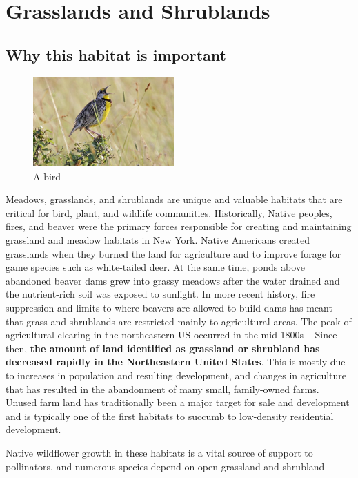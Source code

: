 \section{Grasslands and Shrublands}\label{subsec:grasslandsandshrublands}
\subsection*{Why this habitat is important}
\begin{figure}
    \includegraphics[width=0.48\textwidth]{images/bird.jpg}
  \caption{A bird}
\end{figure}
Meadows, grasslands, and shrublands are unique and valuable habitats that are 
critical for bird, plant, and wildlife communities. Historically, Native 
peoples, fires, and beaver were the primary forces responsible for creating and 
maintaining grassland and meadow habitats in New York. Native Americans created 
grasslands when they burned the land for agriculture and to improve forage for 
game species such as white-tailed deer. At the same time, ponds above abandoned 
beaver dams grew into grassy meadows after the water drained and the 
nutrient-rich soil was exposed to sunlight. In more recent history, fire 
suppression and limits to where beavers are allowed to build dams has meant that 
grass and shrublands are restricted mainly to agricultural areas. The peak of 
agricultural clearing in the northeastern US occurred in the mid-1800s 
~\citep{unhextension} Since then, \textbf{the amount of land identified as grassland or 
shrubland has decreased rapidly in the Northeastern United States}. This is 
mostly due to increases in population and resulting development, and changes in 
agriculture that has resulted in the abandonment of many small, family-owned 
farms. Unused farm land has traditionally been a major target for sale and 
development and is typically one of the first habitats to succumb to low-density 
residential development.
\par
Native wildflower growth in these habitats is a vital source of support to
pollinators, and numerous species depend on open grassland and shrubland
